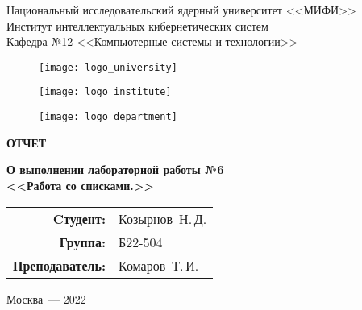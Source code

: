 \begin{titlepage}
    \begin{center}
      \begin{large}
        Национальный исследовательский ядерный университет <<МИФИ>> \\
        \vspace{0.25cm}
        Институт интеллектуальных кибернетических систем \\
        \vspace{0.25cm}
        Кафедра №12 <<Компьютерные системы и технологии>>
      \end{large}
  
      \vspace*{1cm}
  
      \begin{figure}[H]
        \centering
        \begin{minipage}[c]{0.3\textwidth}
          \texttt{[image: logo\_university]}
        \end{minipage}
        \hfill
        \begin{minipage}[c]{0.3\textwidth}
          \texttt{[image: logo\_institute]}
        \end{minipage}
        \hfill
        \begin{minipage}[c]{0.3\textwidth}
          \texttt{[image: logo\_department]}
        \end{minipage}
      \end{figure}
  
      \vspace{4cm}
  
      \begin{huge}
        \textbf{ОТЧЕТ}
      \end{huge}
  
      \begin{large}
        \textbf{О выполнении лабораторной работы №6 \\
          <<Работа со списками.>>}
      \end{large}
      
      \vfill
      
      \begin{flushright}
        \begin{tabular}{ r l }
          \textbf{Cтудент:} & Козырнов~Н.\,Д. \\ 
          \textbf{Группа:} & Б22-504 \\  
          \textbf{Преподаватель:} & Комаров~Т.\,И. \\
        \end{tabular}
      \end{flushright}
              
      Москва~--- 2022
    \end{center}
\end{titlepage}